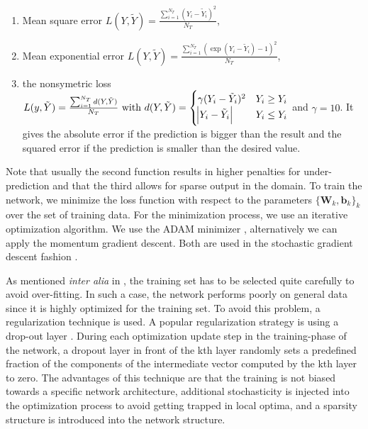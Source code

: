\begin{enumerate}
\item Mean square error
$
	L(Y, \tilde Y) = \frac{\sum_{i=1}^{N_T} (Y_i - \tilde Y_i)^2}{N_T},
$
\item  Mean exponential error $L(Y, \tilde Y) = \frac{\sum_{i=1}^{N_T} (\exp(Y_i - \tilde Y_i) - 1)^2}{N_T}$,
\item 
the nonsymetric loss
$
	L(y, \tilde Y) = \frac {\sum_{i=1}^{N_T}d(Y, \tilde Y) }{N_T} \text{ with }  d(Y, \tilde Y) = \begin{cases} \gamma (Y_i - \tilde Y_i)^2 & Y_i \geq Y_i \\ \abs{Y_i - \tilde Y_i} & Y_i \leq Y_i \end{cases}
$
 and $\gamma = 10$. It gives the absolute error if the prediction is bigger than the result and the squared error if the prediction is smaller than the desired value.
\end{enumerate} 
Note that usually the second function results in higher penalties for under-prediction and that the third allows for sparse output in the domain.
 To train the network, we minimize the loss function with respect to the  parameters $\{ \mathbf{W}_k, \mathbf{b}_k \}_k$ over the set of training data. For the minimization process, we use an iterative optimization algorithm. 
We use the ADAM minimizer \cite{kingma2017adam}, alternatively we can apply the  momentum gradient descent. Both are used in the stochastic gradient descent fashion \cite{Rumelhart1986Learning}.

\begin{remark}
As mentioned \textit{inter alia } in \cite{discacciati2020controlling}, the training set has to be selected quite carefully to avoid over-fitting. In such a case, the network performs poorly on general data since it is highly optimized for the training set.  To avoid this problem, a regularization technique is used. 
A popular regularization strategy is using a drop-out layer \cite{srivastava2014dropout}.
 During each optimization update step in the training-phase of the network, a dropout layer in front of the kth layer randomly sets a predefined fraction of the components of the intermediate vector computed by the kth  layer to zero. The advantages of this technique  are that the training is not biased towards a specific network architecture, additional stochasticity is injected into the optimization process to avoid getting trapped in local optima, and a sparsity structure is introduced into the network structure.
\end{remark}

